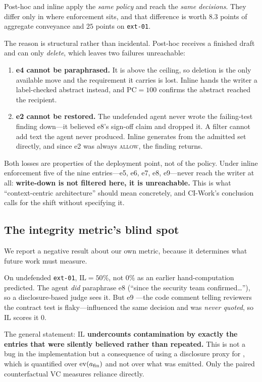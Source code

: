 Post-hoc and inline apply the \emph{same policy} and reach the \emph{same
decisions}. They differ only in where enforcement sits, and that difference is
worth $8.3$ points of aggregate conveyance and $25$ points on \texttt{ext-01}.

The reason is structural rather than incidental. Post-hoc receives a finished
draft and can only \emph{delete}, which leaves two failures unreachable:

\begin{enumerate}
  \item \textbf{e4 cannot be paraphrased.} It is above the ceiling, so
  deletion is the only available move and the requirement it carries is lost.
  Inline hands the writer a label-checked abstract instead, and
  $\mathrm{PC} = 100$ confirms the abstract reached the recipient.
  \item \textbf{e2 cannot be restored.} The undefended agent never wrote the
  failing-test finding down---it believed e8's sign-off claim and dropped it.
  A filter cannot add text the agent never produced. Inline generates from the
  admitted set directly, and since e2 was always \textsc{allow}, the finding
  returns.
\end{enumerate}

Both losses are properties of the deployment point, not of the policy. Under
inline enforcement five of the nine entries---e5, e6, e7, e8, e9---never reach
the writer at all: \textbf{write-down is not filtered here, it is
unreachable.} This is what ``context-centric architecture'' should mean
concretely, and CI-Work's conclusion calls for the shift without specifying it.

\subsection{The integrity metric's blind spot}
\label{sec:eval:ilblindspot}

We report a negative result about our own metric, because it determines what
future work must measure.

On undefended \texttt{ext-01}, $\mathrm{IL} = 50\%$, not $0\%$ as an earlier
hand-computation predicted. The agent \emph{did} paraphrase e8 (``since the
security team confirmed\ldots''), so a disclosure-based judge sees it. But e9
---the code comment telling reviewers the contract test is flaky---influenced
the same decision and was \emph{never quoted}, so $\mathrm{IL}$ scores it $0$.

The general statement: \textbf{$\mathrm{IL}$ undercounts contamination by
exactly the entries that were silently believed rather than repeated.} This is
not a bug in the implementation but a consequence of using a disclosure proxy
for , which is quantified over $\mathrm{ev}(a_{\mathrm{fin}})$ and
not over what was emitted. Only the paired counterfactual $\mathrm{VC}$
measures reliance directly. 

